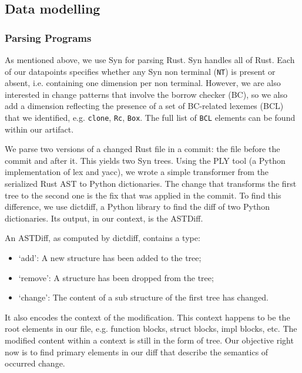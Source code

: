 \subsection{\label{sec:data_modelling}Data modelling}

\subsubsection{\label{sec:parsing_programs}Parsing Programs}

As mentioned above, we use Syn for parsing Rust. Syn handles all of Rust. Each of our datapoints specifies whether any Syn non terminal (\texttt{NT}) is present or absent, i.e. containing one dimension per non terminal. However, we are also interested in change patterns that involve the borrow checker (BC), so we also add a dimension reflecting the presence of a set of BC-related lexemes (BCL) that we identified, e.g. \texttt{clone}, \texttt{Rc}, \texttt{Box}. The full list of \verb+BCL+ elements can be found within our artifact. 

We parse two versions of a changed Rust file in a commit: the file before the commit and after it. This yields two Syn trees. Using the PLY tool (a Python implementation of lex and yacc), we wrote a simple transformer from the serialized Rust AST to Python dictionaries. The change that transforms the first tree to the second one is the fix that was applied in the commit. To find this difference, we use dictdiff, a Python library to find the diff of two Python dictionaries. Its output, in our context, is the ASTDiff.

An ASTDiff, as computed by dictdiff, contains a type:
\begin{itemize}
\item `add': A new structure has been added to the tree; 
\item `remove': A structure has been dropped from the tree; 
\item `change': The content of a sub structure of the first tree has changed.
\end{itemize}
It also encodes the context of the modification. This context happens to be the root elements in our file, e.g. function blocks, struct blocks, impl blocks, etc. The modified content within a context is still in the form of tree. Our objective right now is to find primary elements in our diff that describe the semantics of occurred change.

